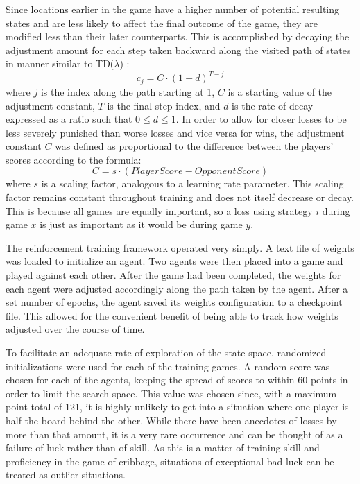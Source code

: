 Since locations earlier in the game have a higher number of potential resulting
states and are less likely to affect the final outcome of the game,
they are modified less than their later counterparts.
%
This is accomplished by decaying the adjustment amount for each step taken
backward along the visited path of states in manner similar to TD($\lambda$)
\cite{tdgammon}:
\[
	c_j = C \cdot (1 - d)^{T-j}
\]
where $j$ is the index along the path starting at 1,
$C$ is a starting value of the adjustment constant,
$T$ is the final step index,
and $d$ is the rate of decay expressed as a ratio such that $0 \leq d \leq 1$.
%
In order to allow for closer losses to be less severely punished than worse
losses and vice versa for wins,
the adjustment constant $C$ was defined as proportional to the difference
between the players' scores according to the formula:
\[
	C = s \cdot \left({PlayerScore} - {OpponentScore}\right) 
\]
where $s$ is a scaling factor,
analogous to a learning rate parameter.
%
This scaling factor remains constant throughout training
and does not itself decrease or decay.
%
This is because all games are equally important,
so a loss using strategy $i$ during game $x$ is just as important as
it would be during game $y$.

The reinforcement training framework operated very simply.
%
A text file of weights was loaded to initialize an agent.
%
Two agents were then placed into a game and played against each other.
%
After the game had been completed,
the weights for each agent were adjusted
accordingly along the path taken by the agent.
%
After a set number of epochs, the agent saved its weights configuration to a
checkpoint file.
%
This allowed for the convenient benefit of being able to track how weights
adjusted over the course of time.

To facilitate an adequate rate of exploration of the state space,
randomized initializations were used for each of the training games.
%
A random score was chosen for each of the agents,
keeping the spread of scores to within 60 points
in order to limit the search space.
%
This value was chosen since,
with a maximum point total of 121,
it is highly unlikely to get into a situation where one player is half the board
behind the other.
%
While there have been anecdotes of losses by more than that amount,
it is a very rare occurrence and can be thought of as a failure of luck
rather than of skill.
%
As this is a matter of training skill and proficiency in the game of cribbage,
situations of exceptional bad luck can be treated as outlier situations.

